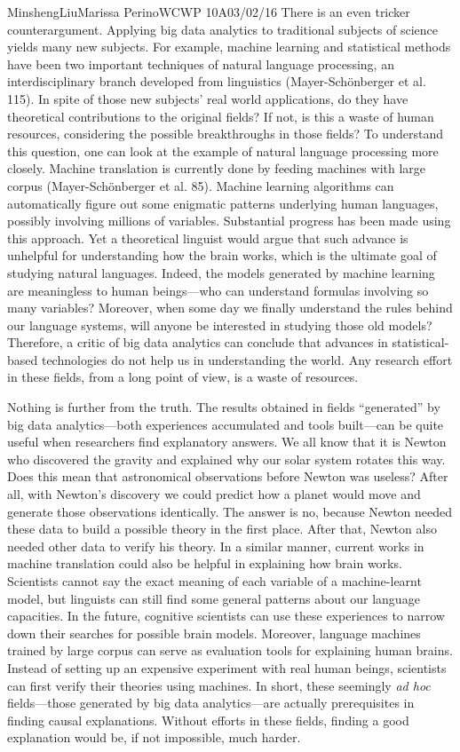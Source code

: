 \documentclass[12pt,letterpaper]{article}
\begin{document}
\begin{mla}{Minsheng}{Liu}{Marissa Perino}{WCWP 10A}{03/02/16}
There is an even tricker counterargument. Applying big data analytics to
traditional subjects of science yields many new subjects. For example,
machine learning and statistical methods have been two important
techniques of natural language processing, an interdisciplinary branch
developed from linguistics (Mayer-Schönberger et al. 115). In spite of
those new subjects' real world applications, do they have theoretical
contributions to the original fields? If not, is this a waste of human
resources, considering the possible breakthroughs in those fields? To
understand this question, one can look at the example of natural
language processing more closely. Machine translation is currently done
by feeding machines with large corpus (Mayer-Schönberger et al. 85).
Machine learning algorithms can automatically figure out some enigmatic
patterns underlying human languages, possibly involving millions of
variables. Substantial progress has been made using this approach. Yet a
theoretical linguist would argue that such advance is unhelpful for
understanding how the brain works, which is the ultimate goal of
studying natural languages. Indeed, the models generated by machine
learning are meaningless to human beings---who can understand formulas
involving so many variables? Moreover, when some day we finally
understand the rules behind our language systems, will anyone be
interested in studying those old models? Therefore, a critic of big data
analytics can conclude that advances in statistical-based technologies
do not help us in understanding the world. Any research effort in these
fields, from a long point of view, is a waste of resources.

Nothing is further from the truth. The results obtained in fields
``generated'' by big data analytics---both experiences accumulated and
tools built---can be quite useful when researchers find explanatory
answers. We all know that it is Newton who discovered the gravity and
explained why our solar system rotates this way. Does this mean that
astronomical observations before Newton was useless? After all, with
Newton's discovery we could predict how a planet would move and generate
those observations identically. The answer is no, because Newton needed
these data to build a possible theory in the first place. After that,
Newton also needed other data to verify his theory. In a similar manner,
current works in machine translation could also be helpful in explaining
how brain works. Scientists cannot say the exact meaning of each
variable of a machine-learnt model, but linguists can still find some
general patterns about our language capacities. In the future, cognitive
scientists can use these experiences to narrow down their searches for
possible brain models. Moreover, language machines trained by large
corpus can serve as evaluation tools for explaining human brains.
Instead of setting up an expensive experiment with real human beings,
scientists can first verify their theories using machines. In short,
these seemingly \emph{ad hoc} fields---those generated by big data
analytics---are actually prerequisites in finding causal explanations.
Without efforts in these fields, finding a good explanation would be, if
not impossible, much harder.


\end{mla}
\end{document}
